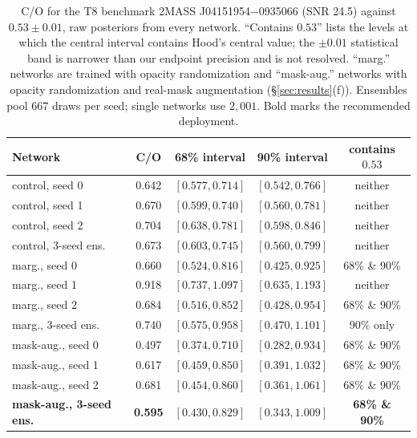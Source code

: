 \documentclass{article}
\begin{document}
\begin{table}[h]
\centering
\caption{C/O for the T8 benchmark 2MASS J04151954$-$0935066 (SNR 24.5) against
\citet{hood2024} $0.53\pm0.01$, raw posteriors from every network. ``Contains
$0.53$'' lists the levels at which the central interval contains Hood's central
value; the $\pm0.01$ statistical band is narrower than our endpoint precision
and is not resolved. ``marg.'' networks are trained with opacity randomization
and ``mask-aug.'' networks with opacity randomization and real-mask
augmentation (\S\ref{sec:results}(f)). Ensembles pool $667$ draws per seed;
single networks use $2{,}001$. Bold marks the recommended deployment.}
\label{tab:real}
\begin{tabular}{lcccc}
\toprule
Network & C/O & 68\% interval & 90\% interval & contains $0.53$ \\
\midrule
control, seed 0 & 0.642 & $[0.577,0.714]$ & $[0.542,0.766]$ & neither \\
control, seed 1 & 0.670 & $[0.599,0.740]$ & $[0.560,0.781]$ & neither \\
control, seed 2 & 0.704 & $[0.638,0.781]$ & $[0.598,0.846]$ & neither \\
control, 3-seed ens. & 0.673 & $[0.603,0.745]$ & $[0.560,0.799]$ & neither \\
\midrule
marg., seed 0 & 0.660 & $[0.524,0.816]$ & $[0.425,0.925]$ & 68\% \& 90\% \\
marg., seed 1 & 0.918 & $[0.737,1.097]$ & $[0.635,1.193]$ & neither \\
marg., seed 2 & 0.684 & $[0.516,0.852]$ & $[0.428,0.954]$ & 68\% \& 90\% \\
marg., 3-seed ens. & 0.740 & $[0.575,0.958]$ & $[0.470,1.101]$ & 90\% only \\
\midrule
mask-aug., seed 0 & 0.497 & $[0.374,0.710]$ & $[0.282,0.934]$ & 68\% \& 90\% \\
mask-aug., seed 1 & 0.617 & $[0.459,0.850]$ & $[0.391,1.032]$ & 68\% \& 90\% \\
mask-aug., seed 2 & 0.681 & $[0.454,0.860]$ & $[0.361,1.061]$ & 68\% \& 90\% \\
\textbf{mask-aug., 3-seed ens.} & \textbf{0.595} & $[0.430,0.829]$ & $[0.343,1.009]$ & \textbf{68\% \& 90\%} \\
\bottomrule
\end{tabular}
\end{table}
\end{document}
